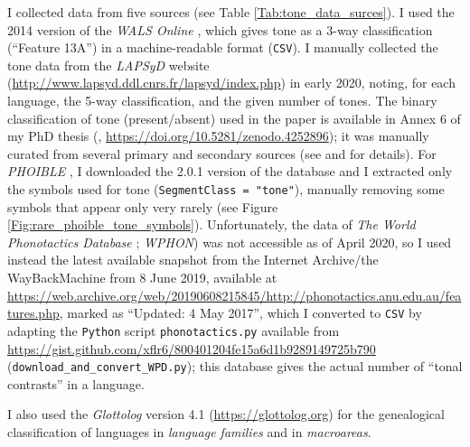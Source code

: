 \documentclass[twoside,onecolumn]{article}
\begin{document}
I collected data from five sources (see Table \ref{Tab:tone_data_surces}).
I used the 2014 version of the \textit{WALS Online} \citep{dryer_wals_2013}, which gives tone as a 3-way classification (``Feature 13A'') in a machine-readable format (\texttt{CSV}).
I manually collected the tone data from the \textit{LAPSyD} website (\url{http://www.lapsyd.ddl.cnrs.fr/lapsyd/index.php}) in early 2020, noting, for each language, the 5-way classification, and the given number of tones.
The binary classification of tone (present/absent) used in the \citet{dediu_ladd_2007} paper is available in Annex 6 of my PhD thesis (\citealp{dediu_phd_2007}, \url{https://doi.org/10.5281/zenodo.4252896}); it was manually curated from several primary and secondary sources (see \citealp{dediu_phd_2007} and \citealp{dediu_phd_2007} for details).
For \textit{PHOIBLE} \citep{moran_phoible_2014}, I downloaded the 2.0.1 version of the database and I extracted only the symbols used for tone (\texttt{SegmentClass = "tone"}), manually removing some symbols that appear only very rarely (see Figure \ref{Fig:rare_phoible_tone_symbols}).
Unfortunately, the data of \textit{The World Phonotactics Database} \citealp{donohue_world_2013}; \textit{WPHON}) was not accessible as of April 2020, so I used instead the latest available snapshot from the Internet Archive/the WayBackMachine from 8 June 2019, available at \url{https://web.archive.org/web/20190608215845/http://phonotactics.anu.edu.au/features.php}, marked as ``Updated: 4 May 2017'', which I converted to \texttt{CSV} by adapting the \texttt{Python} script \texttt{phonotactics.py} available from \url{https://gist.github.com/xflr6/800401204fe15a6d1b9289149725b790} (\verb|download_and_convert_WPD.py|); this database gives the actual number of ``tonal contrasts'' in a language.

I also used the \textit{Glottolog} \citep{hammarstrom_glottolog_2018} version 4.1 (\url{https://glottolog.org}) for the genealogical classification of languages in \emph{language families} and in \textit{macroareas}.
\end{document}
